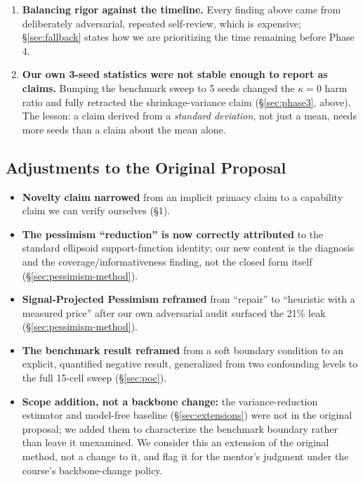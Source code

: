 \documentclass[11pt]{article}
\begin{document}
\begin{enumerate}
  cells under a direct implementation). \emph{Resolved} by three structural
  factorizations specific to the environment's observation design (hashed encoding,
  core-diagonal bridge support, closed-form $2\times2$ local inversions).
  \item \textbf{Balancing rigor against the timeline.} Every finding above came from
  deliberately adversarial, repeated self-review, which is expensive; \S\ref{sec:fallback}
  states how we are prioritizing the time remaining before Phase 4.
  \item \textbf{Our own 3-seed statistics were not stable enough to report as claims.}
  Bumping the benchmark sweep to 5 seeds changed the $\kappa{=}0$ harm ratio and
  fully retracted the shrinkage-variance claim (\S\ref{sec:phase3}, above). The lesson: a
  claim derived from a \emph{standard deviation}, not just a mean, needs more seeds than a
  claim about the mean alone.
\end{enumerate}

\subsection{Adjustments to the Original Proposal}

\begin{itemize}
  \item \textbf{Novelty claim narrowed} from an implicit primacy claim to a capability
  claim we can verify ourselves (\S1).
  \item \textbf{The pessimism ``reduction'' is now correctly attributed} to the standard
  ellipsoid support-function identity; our new content is the diagnosis and the
  coverage/informativeness finding, not the closed form itself (\S\ref{sec:pessimism-method}).
  \item \textbf{Signal-Projected Pessimism reframed} from ``repair'' to ``heuristic with a
  measured price'' after our own adversarial audit surfaced the 21\% leak
  (\S\ref{sec:pessimism-method}).
  \item \textbf{The benchmark result reframed} from a soft boundary condition to an
  explicit, quantified negative result, generalized from two confounding levels to the
  full 15-cell sweep (\S\ref{sec:poc}).
  \item \textbf{Scope addition, not a backbone change:} the variance-reduction estimator
  and model-free baseline (\S\ref{sec:extensions}) were not in the original proposal; we
  added them to characterize the benchmark boundary rather than leave it unexamined. We
  consider this an extension of the original method, not a change to it, and flag it for
  the mentor's judgment under the course's backbone-change policy.
\end{itemize}
\end{document}
